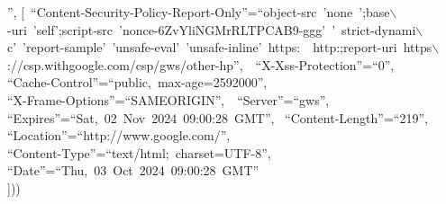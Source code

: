\documentclass{article}
\begin{document}
\begin{maplegroup}
\begin{maplelatex}
{{{''}, [\mbox{
``Content-Security-Policy-Report-Only''}=\mbox{``object-src~'none
';base$\backslash$} \\
\mbox{-uri~'self';script-src~'nonce-6ZvYliNGMrRLTPCAB9-ggg'~'
strict-dynami$\backslash$} \\
\mbox{c'~'report-sample'~'unsafe-eval'~'unsafe-inline'~https:~
http:;report-uri~https$\backslash$} \\
\mbox{://csp.withgoogle.com/csp/gws/other-hp''}, \,\mbox{
``X-Xss-Protection''}=\mbox{``0''},  \\
\mbox{``Cache-Control''}=\mbox{``public,~max-age=2592000''},  \\
\mbox{``X-Frame-Options''}=\mbox{``SAMEORIGIN''}, \,\mbox{
``Server''}=\mbox{``gws''},  \\
\mbox{``Expires''}=\mbox{``Sat,~02~Nov~2024~09:00:28~GMT''}, \,
\mbox{``Content-Length''}=\mbox{``219''},  \\
\mbox{``Location''}=\mbox{``http://www.google.com/''},  \\
\mbox{``Content-Type''}=\mbox{``text/html;~charset=UTF-8''},  \\
\mbox{``Date''}=\mbox{``Thu,~03~Oct~2024~09:00:28~GMT''} \\
])) }
%
}
\end{maplelatex}

\end{maplegroup}
\begin{maplegroup}
\begin{mapleinput}
\end{mapleinput}

\mapleresult
\begin{maplelatex}
\end{maplelatex}

\end{maplegroup}
\begin{maplegroup}
\begin{mapleinput}
\end{mapleinput}

\begin{mapleinput}
\end{mapleinput}

\mapleresult
\begin{maplelatex}
\end{maplelatex}

\end{maplegroup}
\end{document}
